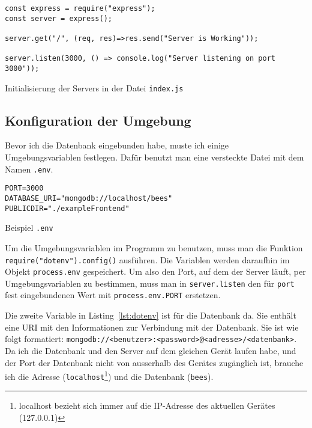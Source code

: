 \documentclass[a4paper, ngerman, 12pt]{scrartcl}
\newcommand{\js}[1]{\texttt{#1}}
\begin{document}
\begin{listing}[hb]
\centering
\begin{verbatim}
const express = require("express");
const server = express();

server.get("/", (req, res)=>res.send("Server is Working"));

server.listen(3000, () => console.log("Server listening on port 3000"));
\end{verbatim}
\caption{Initialisierung der Servers in der Datei \texttt{index.js}\label{lst:initserver}}
\end{listing}


\subsection{Konfiguration der Umgebung} %

Bevor ich die Datenbank eingebunden habe, muste ich einige Umgebungsvariablen festlegen.
Dafür benutzt man eine versteckte Datei mit dem Namen \texttt{.env}.
\begin{listing}[hb]
\centering
\begin{verbatim}
PORT=3000
DATABASE_URI="mongodb://localhost/bees"
PUBLICDIR="./exampleFrontend"
\end{verbatim}
\caption{Beispiel \texttt{.env}}\label{lst:dotenv}
\end{listing}

Um die Umgebungsvariablen im Programm zu benutzen, muss man die Funktion \js{require("dotenv").config()} ausführen.
Die Variablen werden daraufhin im Objekt \js{process.env} gespeichert.
Um also den Port, auf dem der Server läuft, per Umgebungsvariablen zu bestimmen, muss man in \js{server.listen} den für \texttt{port} fest eingebundenen Wert mit \js{process.env.PORT} erstetzen.

Die zweite Variable in Listing~\ref{lst:dotenv} ist für die Datenbank da.
Sie enthält eine URI mit den Informationen zur Verbindung mit der Datenbank.
Sie ist wie folgt formatiert: \texttt{mongodb://<benutzer>:<password>@<adresse>/<datenbank>}.
Da ich die Datenbank und den Server auf dem gleichen Gerät laufen habe, und der Port der Datenbank nicht von ausserhalb des Gerätes zugänglich ist, brauche ich die Adresse (\texttt{localhost}\footnote{localhost bezieht sich immer auf die IP-Adresse des aktuellen Gerätes (127.0.0.1) }) und die Datenbank (\texttt{bees}).
\end{document}
